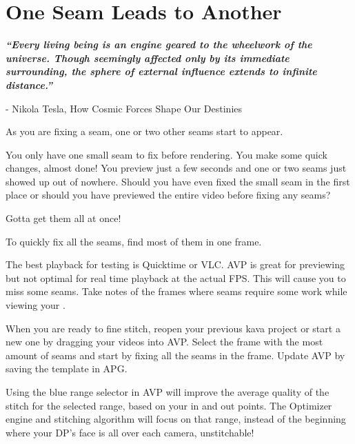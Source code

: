 \chapter{One Seam Leads to Another}
\pagecolor{white}
\label{chap:38}
\begin{fullwidth}

{\itshape\bfseries “Every living being is an engine geared to the wheelwork of the universe. Though seemingly affected only by its immediate surrounding, the sphere of external influence extends to infinite distance.”}

- Nikola Tesla, How Cosmic Forces Shape Our Destinies
\vspace{\baselineskip}

\problem

{\large As you are fixing a seam, one or two other seams start to appear. \par}

You only have one small seam to fix before rendering. You make some quick changes, almost done! You preview just a few seconds and one or two seams just showed up out of nowhere. Should you have even fixed the small seam in the first place or should you have previewed the entire video before fixing any seams?

\solutions

{\large Gotta get them all at once! \par}

To quickly fix all the seams, find most of them in one frame. 

\clearpage
The best playback for testing is Quicktime or VLC. AVP is great for previewing but not optimal for real time playback at the actual FPS. This will cause you to miss some seams. Take notes of the frames where seams require some work while viewing your \textbf{}.


When you are ready to fine stitch, reopen your previous kava project or start a new one by dragging your videos into AVP. Select the frame with the most amount of seams and start by fixing all the seams in the frame. Update AVP by saving the template in APG.

Using the blue range selector in AVP will improve the average quality of the stitch for the selected range, based on your in and out points. The Optimizer engine and stitching algorithm will focus on that range, instead of the beginning where your DP’s face is all over each camera, unstitchable!


\end{fullwidth}
